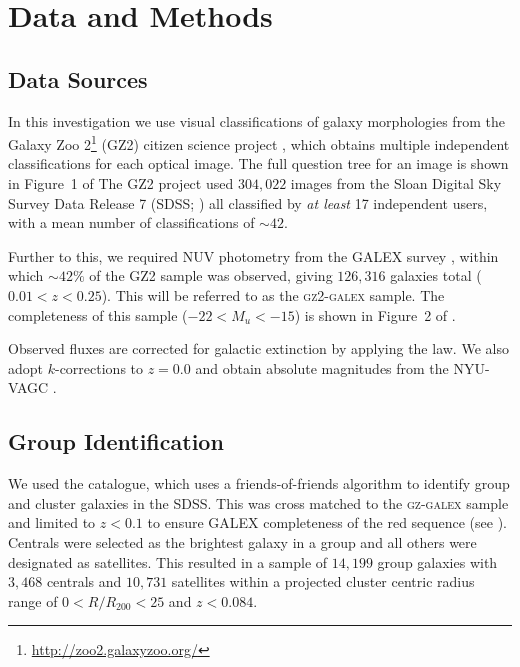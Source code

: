 \documentclass[useAMS,usenatbib]{mn2e}
\begin{document}
\section{Data and Methods}\label{sec:data}

\subsection{Data Sources}\label{sec:photo}

In this investigation we use visual classifications of galaxy morphologies from the Galaxy Zoo 2\footnote{\url{http://zoo2.galaxyzoo.org/}} (GZ2) citizen science project \citep{GZ2}, which obtains multiple independent classifications for each optical image. The full question tree for an image is shown in Figure~1 of \citeauthor{GZ2}  The GZ2 project used $304, 022$ images from the Sloan Digital Sky Survey Data Release 7 (SDSS; \citealt{york00, abazajian09}) all classified by \emph{at least} 17 independent users, with a mean number of classifications of $\sim42$.

Further to this, we required NUV photometry from the GALEX survey \citep{martin05}, within which $\sim42\%$ of the GZ2 sample was observed, giving $126, 316$ galaxies total ($0.01 < z < 0.25$). This will be referred to as the \textsc{gz2-galex} sample. The completeness of this sample ($-22 < M_u < -15$) is shown in Figure~2 of \cite{smethurst15}. 

Observed fluxes are corrected for galactic extinction \citep{Oh11} by applying the \citet*{cardelli89} law. We also adopt $k$-corrections to $z = 0.0$ and obtain absolute magnitudes from the NYU-VAGC \citep{blanton05, padova08}.


\subsection{Group Identification}\label{sec:groups}

We used the \citet{berlind06} catalogue, which uses a friends-of-friends algorithm to identify group and cluster galaxies in the SDSS. This was cross matched to the \textsc{gz-galex} sample and limited to $z < 0.1$ to ensure GALEX completeness of the red sequence (see \citealt{ref}). Centrals were selected as the brightest galaxy in a group and all others were designated as satellites. This resulted in a sample of $14,199$ group galaxies with $3,468$ centrals and $10,731$ satellites within a projected cluster centric radius range of $0 < R/R_{200} < 25$ and $z < 0.084$. 
\end{document}
